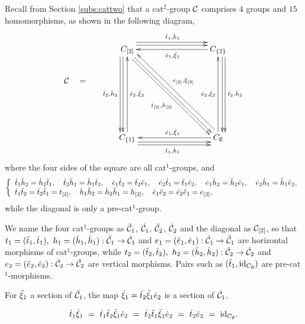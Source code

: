 Recall from Section \ref{subs:cattwo} that a cat$^2$-group  $\mathcal{C}$  
comprises $4$ groups and $15$ homomorphisms,
as shown in the following diagram,
$$
\xymatrix{
 & C_{[2]} \ar[ddd] <-1.2ex>  \ar[ddd] <-2.0ex>_{\ddttt,\ddhht}
     \ar[rrr] <+1.2ex>  \ar[rrr] <+2.0ex>^{\ddtto,\ddhho}
     \ar[dddrrr] <-0.2ex>  \ar[dddrrr] <-1.0ex>_(0.55){\ttot,\hhot}
    &&&  C_{\{2\}}  \ar[lll]^{\ddeeo, \ddxo}
            \ar[ddd]<+1.2ex>  \ar[ddd] <+2.0ex>^{\dttt,\dhht}  \\
\calC \quad = \quad
 &  &&&   \\
 &  &&&   \\
 & C_{\{1\}} \ar[uuu]_{\ddeet, \ddxt}
     \ar[rrr] <-1.2ex>  \ar[rrr] <-2.0ex>_{\dtto,\dhho} 
    &&&  C_{\emptyset} \ar[uuu]^{\deet, \dxt}   \ar[lll]_{\deeo, \dxo} 
           \ar[uuulll] <-1.0ex>_(0.55){\eeot, \xot}
 \\
}
$$
where the four sides of the square are all cat$^1$-groups,
and
\begin{equation} \label{eq:cat-commute}
\left\{ \begin{array}{l}
 \dot{t}_1\ddot{h}_2 = \dot{h}_2\ddot{t}_1, \quad
 \dot{t}_2\ddot{h}_1 = \dot{h}_1\ddot{t}_2, \quad
 \dot{e}_1\dot{t}_2 = \ddot{t}_2\ddot{e}_1, \quad
 \dot{e}_2\dot{t}_1 = \ddot{t}_1\ddot{e}_2, \quad
 \dot{e}_1\dot{h}_2 = \ddot{h}_2\ddot{e}_1, \quad
 \dot{e}_2\dot{h}_1 = \ddot{h}_1\ddot{e}_2,  \\
 \dot{t}_1\ddot{t}_2 = \dot{t}_2\ddot{t}_1 = t_{[2]}, \quad 
 \dot{h}_1\ddot{h}_2 = \dot{h}_2\ddot{h}_1 = h_{[2]}, \quad
 \dot{e}_1\ddot{e}_2 = \dot{e}_2\ddot{e}_1 = e_{[2]}, \\
\end{array} \right.
\end{equation}
while the diagonal is only a pre-cat$^1$-group.

\medskip
We name the four cat$^1$-groups as 
$\ddot{\mathcal{C}}_1$, $\dot{\mathcal{C}}_1$, $\ddot{\mathcal{C}}_2$, $\dot{\mathcal{C}}_2$ 
and the diagonal as $\mathcal{C}_{[2]}$, 
so that 
$t_1 = (\ddot{t}_1,\dot{t}_1),~ h_1 = (\ddot{h}_1,\dot{h}_1) : \ddot{\mathcal{C}}_1 \to \dot{\mathcal{C}}_1$ 
and
$e_1 = (\ddot{e}_1,\dot{e}_1) : \dot{\mathcal{C}}_1 \to \ddot{\mathcal{C}}_1$ 
are horizontal morphisms of cat$^1$-groups, while 
$t_2 = (\ddot{t}_2,\dot{t}_2),~ h_2 = (\ddot{h}_2,\dot{h}_2) : \ddot{\mathcal{C}}_2 \to \dot{\mathcal{C}}_2$ 
and
$e_2 = (\ddot{e}_2,\dot{e}_2) : \dot{\mathcal{C}}_2 \to \ddot{\mathcal{C}}_2$ 
are vertical morphisms.
Pairs such as $(\ddot{t}_1,\mathrm{id}_{C_{\emptyset}})$ are pre-cat$^1$-morphisms.

\begin{lem} \label{lem:xio-is-sect}
For $\ddot{\xi}_1$ a section of $\ddot{\mathcal{C}}_1$, the map $\dot{\xi}_1 = \ddot{t}_2\ddot{\xi}_1\dot{e}_2$ 
is a section of $\dot{\mathcal{C}}_1$. 
\end{lem}
\begin{pf}
$$
\dot{t}_1\dot{\xi}_1 ~=~ \dot{t}_1\ddot{t}_2\ddot{\xi}_1\dot{e}_2 ~=~ \dot{t}_2\ddot{t}_1\ddot{\xi}_1\dot{e}_2 
~=~ \dot{t}_2\dot{e}_2 ~=~ \mathrm{id}_{C_{\emptyset}}.
$$
\end{pf}

